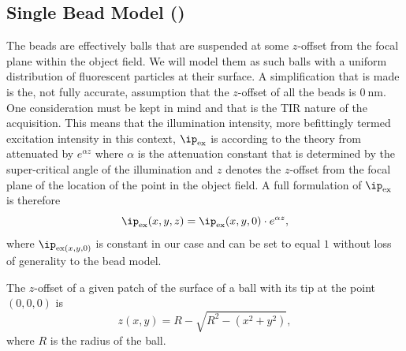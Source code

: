 \subsection{Single Bead Model ()}%

The beads are effectively balls that are suspended at some \(z\)-offset from the focal plane within the object field. %
We will model them as such balls with a uniform distribution of fluorescent particles at their surface.
A simplification that is made is the, not fully accurate, assumption that the \(z\)-offset of all the beads is
    \(\qty{0}{\nano\meter}\).
One consideration must be kept in mind and that is the \ac{TIR} nature of the acquisition.
This means that the illumination intensity, more befittingly termed excitation intensity in this context, 
    \(\ip_{\text{ex}}\) is according to the theory from  attenuated by \(e^{\alpha z}\) where \(\alpha\) is 
    the attenuation constant that is determined by the super-critical angle of the illumination and \(z\) denotes the 
    \(z\)-offset from the focal plane of the location of the point in the object field. %
A full formulation of \(\ip_{\text{ex}}\) is therefore
    \begin{equation*}
        \ip_{\text{ex}}(x,y,z) = \ip_{\text{ex}}(x,y,0) \cdot e^{\alpha z},
    \end{equation*}
    where \(\ip_{\text{ex}(x,y,0)}\) is constant in our case and can be set to equal \(1\) without loss of generality to
    the bead model.

The \(z\)-offset of a given patch of the surface of a ball with its tip at the point \((0,0,0)\) is 
    \begin{equation*}
      z(x,y) = R - \sqrt{R^2 - (x^2 + y^2)},
    \end{equation*}
    where \(R\) is the radius of the ball.

